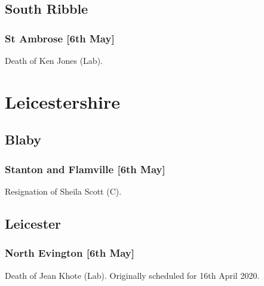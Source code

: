 \documentclass[a4paper,openany]{book}
\begin{document}
\begin{resultsiii}
\subsection*{South Ribble}

\subsubsection*{St Ambrose \hspace*{\fill}\nolinebreak[1]%
	\enspace\hspace*{\fill}
	[6th May]}


Death of Ken Jones (Lab).

\section{Leicestershire}

\subsection*{Blaby}

\subsubsection*{Stanton and Flamville \hspace*{\fill}\nolinebreak[1]%
	\enspace\hspace*{\fill}
	[6th May]}


Resignation of Sheila Scott (C).

\subsection*{Leicester}

\subsubsection*{North Evington \hspace*{\fill}\nolinebreak[1]%
	\enspace\hspace*{\fill}
	[6th May]}


Death of Jean Khote (Lab).  Originally scheduled for 16th April 2020.


\end{resultsiii}
\end{document}
